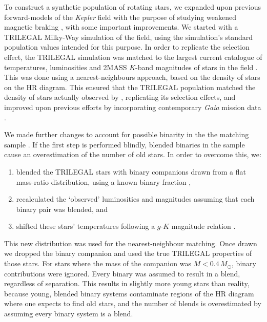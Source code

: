 To construct a synthetic population of rotating stars, we expanded upon previous forward-models of the \textit{Kepler} field with the purpose of studying weakened magnetic braking \cite{vansaders+2019}, with some important improvements. We started with a TRILEGAL \cite{girardi+2012} Milky-Way simulation of the \kepler field, using the simulation's standard population values intended for this purpose. In order to replicate the \kepler selection effect, the TRILEGAL simulation was matched to the largest current catalogue of temperatures, luminosities and 2MASS $K$-band magnitudes of stars in the \kepler field \cite{berger+2020}. This was done using a nearest-neighbours approach, based on the density of stars on the HR diagram. This ensured that the TRILEGAL population matched the density of stars actually observed by \kepler, replicating its selection effects, and improved upon previous efforts \cite{vansaders+2019} by incorporating contemporary \textit{Gaia} mission data \cite{gaiacollaboration+2018}.

We made further changes to account for possible binarity in the the matching sample \cite{berger+2020}. If the first step is performed blindly, blended binaries in the sample cause an overestimation of the number of old stars. In order to overcome this, we:

\begin{enumerate}
	\item blended the TRILEGAL stars with binary companions drawn from a flat mass-ratio distribution, using a known binary fraction \cite{raghavan+2010},
	\item recalculated the `observed' luminosities and magnitudes assuming that each binary pair was blended, and
	\item shifted these stars' temperatures following a $g$-$K$ magnitude relation \cite{berger+2020}.
\end{enumerate}

This new distribution was used for the nearest-neighbour matching. Once drawn we dropped the binary companion and used the true TRILEGAL properties of those stars. For stars where the mass of the companion was $M < 0.4\, M_\odot$, binary contributions were ignored. Every binary was assumed to result in a blend, regardless of separation. This results in slightly more young stars than reality, because young, blended binary systems contaminate regions of the HR diagram where one expects to find old stars, and the number of blends is overestimated by assuming every binary system is a blend.

